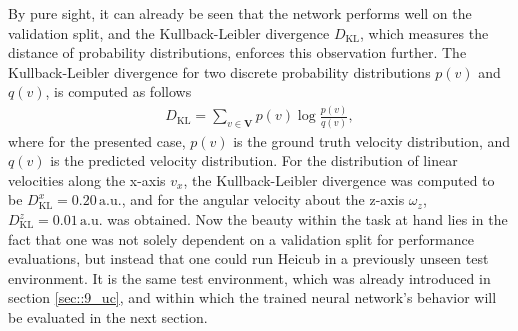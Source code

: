 By pure sight, it can already be seen that the network performs well on the validation split, and the Kullback-Leibler divergence $D_\text{KL}$, which measures the distance of probability distributions, enforces this observation further. The Kullback-Leibler divergence for two discrete probability distributions $p(v)$ and $q(v)$, is computed as follows
\begin{align}
	D_\text{KL} = \sum_{v\in \bm{V}}p(v)\log\frac{p(v)}{q(v)},
\end{align}
where for the presented case, $p(v)$ is the ground truth velocity distribution, and $q(v)$ is the predicted velocity distribution. For the distribution of linear velocities along the x-axis $v_x$, the Kullback-Leibler divergence was computed to be $D^x_\text{KL}=0.20\,\text{a.u.}$, and for the angular velocity about the z-axis $\omega_z$, $D^z_\text{KL}=0.01\,\text{a.u.}$ was obtained. Now the beauty within the task at hand lies in the fact that one was not solely dependent on a validation split for performance evaluations, but instead that one could run Heicub in a previously unseen test environment. It is the same test environment, which was already introduced in section \ref{sec::9_uc}, and within which the trained neural network's behavior will be evaluated in the next section.
\FloatBarrier
